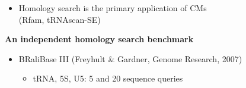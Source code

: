 \documentclass[landscape]{slides}
\begin{document}
\begin{slide}
\begin{itemize}
\item
Homology search is the primary application of CMs \\ (Rfam, tRNAscan-SE)
\end{itemize}

\vfill

\end{slide}
\begin{slide}
\begin{center}
\large
\textbf{An independent homology search benchmark}
\end{center}
\medskip

\small
\begin{itemize}
\item
  BRaliBase III (Freyhult \& Gardner, Genome Research, 2007)
  \begin{itemize}
  \item
    tRNA, 5S, U5: 5 and 20 sequence queries
\end{itemize}
\end{itemize}

\vfill 
\end{slide}
\end{document}
